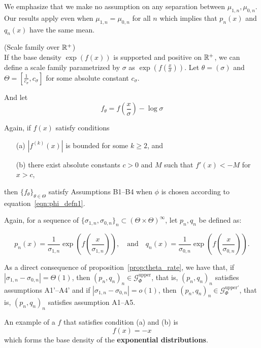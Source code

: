\documentclass{article}
\begin{document}
We emphasize that we make no assumption on any separation between $\mu_{1,n}, \mu_{0,n}$. Our results apply even when $\mu_{1,n} = \mu_{0,n}$ for all $n$ which implies that $p_n(x)$ and $q_n(x)$ have the same mean. 


\begin{example}
\label{ex:scale_on_R_plus}
  (Scale family over ${\mathbb R}^+$)\\
  
If the base density $\exp(f(x))$ is supported and positive on ${\mathbb R}^+$, we can define a scale family parametrized by $\sigma$ as 
$\exp( f(\frac{x}{\sigma}) )$. Let $\theta = (\sigma)$ and $\Theta = \left[\frac{1}{c_{\sigma}}, c_{\sigma} \right]$ for some absolute constant $c_{\sigma}$. 

And let 
\[
f_{\theta} = f\left( \frac{x}{\sigma} \right) - \log \sigma
\]


Again, if $f(x)$ satisfy conditions
\begin{itemize}
\item[(a)] $|f^{(k)}(x)|$ is bounded for some $k \geq 2$, and
\item[(b)] there exist absolute constants $c > 0$ and $M$ such that $f'(x) < -M$ for $x > c$,
\end{itemize}

then $\{f_{\theta} \}_{\theta \in \Theta}$ satisfy Assumptions B1--B4 when $\phi$ is chosen according to equation~\eqref{eqn:phi_defn1}. 

Again, for a sequence of $\{\sigma_{1,n}, \sigma_{0,n}\}_n \subset (\Theta \times \Theta)^\infty$, let $p_n, q_n$ be defined as:
 
$$
p_n(x) = \frac{1}{\sigma_{1,n}}  \exp\left( f\left( \frac{x}{\sigma_{1,n}}  \right) \right), \quad \textrm{and} \quad 
q_n(x) = \frac{1}{\sigma_{0,n}} \exp\left( f \left( \frac{x}{\sigma_{0,n}}  \right) \right).
$$ 


As a direct consequence of proposition~\ref{prop:theta_rate}, we have that, if $|\sigma_{1,n} - \sigma_{0,n}| = \Theta(1)$, then $(p_n, q_n)_n \in \mathcal{G}^{\textrm{upper}}_\Phi$, that is, $(p_n, q_n)_n$ satisfies assumptions A1'--A4' and if  $ |\sigma_{1,n} - \sigma_{0,n}| = o(1)$, then $(p_n, q_n)_n \in \mathcal{G}^{\textrm{upper} \prime}_\Phi$, that is, $(p_n, q_n)_n$ satisfies assumption A1--A5.

An example of a $f$ that satisfies condition (a) and (b) is 
\[
  f(x) = -x
\]
which forms the base density of the \textbf{exponential distributions}.

\end{example}
\end{document}
